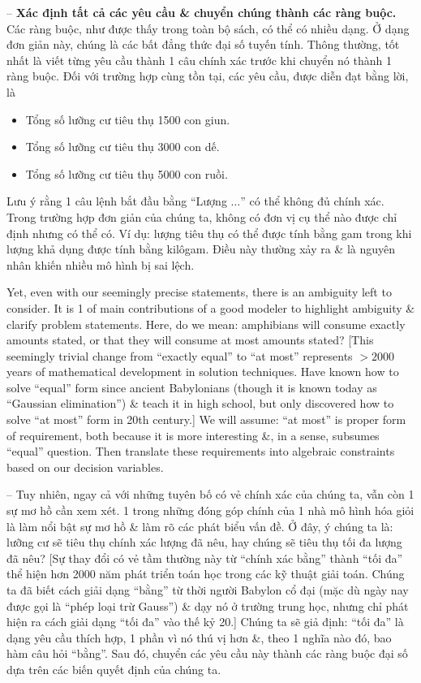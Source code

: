 \documentclass{article}
\begin{document}
\begin{itemize}
\begin{itemize}
\begin{enumerate}
            -- {\bf Xác định tất cả các yêu cầu \& chuyển chúng thành các ràng buộc.} Các ràng buộc, như được thấy trong toàn bộ sách, có thể có nhiều dạng. Ở dạng đơn giản này, chúng là các bất đẳng thức đại số tuyến tính. Thông thường, tốt nhất là viết từng yêu cầu thành 1 câu chính xác trước khi chuyển nó thành 1 ràng buộc. Đối với trường hợp cùng tồn tại, các yêu cầu, được diễn đạt bằng lời, là
            \begin{itemize}
                \item Tổng số lưỡng cư tiêu thụ 1500 con giun.
                \item Tổng số lưỡng cư tiêu thụ 3000 con dế.
                \item Tổng số lưỡng cư tiêu thụ 5000 con ruồi.
            \end{itemize}
            Lưu ý rằng 1 câu lệnh bắt đầu bằng ``Lượng $\ldots$'' có thể không đủ chính xác. Trong trường hợp đơn giản của chúng ta, không có đơn vị cụ thể nào được chỉ định nhưng có thể có. Ví dụ: lượng tiêu thụ có thể được tính bằng gam trong khi lượng khả dụng được tính bằng kilôgam. Điều này thường xảy ra \& là nguyên nhân khiến nhiều mô hình bị sai lệch.

            Yet, even with our seemingly precise statements, there is an ambiguity left to consider. It is 1 of main contributions of a good modeler to highlight ambiguity \& clarify problem statements. Here, do we mean: amphibians will consume exactly amounts stated, or that they will consume at most amounts stated? [This seemingly trivial change from ``exactly equal'' to ``at most'' represents $> 2000$ years of mathematical development in solution techniques. Have known how to solve ``equal'' form since ancient Babylonians (though it is known today as ``Gaussian elimination'') \& teach it in high school, but only discovered how to solve ``at most'' form in 20th century.] We will assume: ``at most'' is proper form of requirement, both because it is more interesting \&, in a sense, subsumes ``equal'' question. Then translate these requirements into algebraic constraints based on our decision variables.

            -- Tuy nhiên, ngay cả với những tuyên bố có vẻ chính xác của chúng ta, vẫn còn 1 sự mơ hồ cần xem xét. 1 trong những đóng góp chính của 1 nhà mô hình hóa giỏi là làm nổi bật sự mơ hồ \& làm rõ các phát biểu vấn đề. Ở đây, ý chúng ta là: lưỡng cư sẽ tiêu thụ chính xác lượng đã nêu, hay chúng sẽ tiêu thụ tối đa lượng đã nêu? [Sự thay đổi có vẻ tầm thường này từ ``chính xác bằng'' thành ``tối đa'' thể hiện hơn 2000 năm phát triển toán học trong các kỹ thuật giải toán. Chúng ta đã biết cách giải dạng ``bằng'' từ thời người Babylon cổ đại (mặc dù ngày nay được gọi là ``phép loại trừ Gauss'') \& dạy nó ở trường trung học, nhưng chỉ phát hiện ra cách giải dạng ``tối đa'' vào thế kỷ 20.] Chúng ta sẽ giả định: ``tối đa'' là dạng yêu cầu thích hợp, 1 phần vì nó thú vị hơn \&, theo 1 nghĩa nào đó, bao hàm câu hỏi ``bằng''. Sau đó, chuyển các yêu cầu này thành các ràng buộc đại số dựa trên các biến quyết định của chúng ta.


\end{enumerate}
\end{itemize}
\end{itemize}
\end{document}
